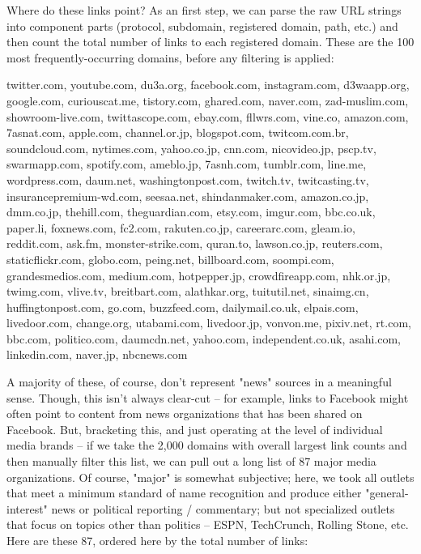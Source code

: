 \documentclass{scrartcl}
\begin{document}
Where do these links point? As an first step, we can parse the raw URL strings into component parts (protocol, subdomain, registered domain, path, etc.) and then count the total number of links to each registered domain. These are the 100 most frequently-occurring domains, before any filtering is applied:

\begin{displayquote}
\scriptsize \raggedright twitter.com, youtube.com, du3a.org, facebook.com, instagram.com, d3waapp.org, google.com, curiouscat.me, tistory.com, ghared.com, naver.com, zad-muslim.com, showroom-live.com, twittascope.com, ebay.com, fllwrs.com, vine.co, amazon.com, 7asnat.com, apple.com, channel.or.jp, blogspot.com, twitcom.com.br, soundcloud.com, nytimes.com, yahoo.co.jp, cnn.com, nicovideo.jp, pscp.tv, swarmapp.com, spotify.com, ameblo.jp, 7asnh.com, tumblr.com, line.me, wordpress.com, daum.net, washingtonpost.com, twitch.tv, twitcasting.tv, insurancepremium-wd.com, seesaa.net, shindanmaker.com, amazon.co.jp, dmm.co.jp, thehill.com, theguardian.com, etsy.com, imgur.com, bbc.co.uk, paper.li, foxnews.com, fc2.com, rakuten.co.jp, careerarc.com, gleam.io, reddit.com, ask.fm, monster-strike.com, quran.to, lawson.co.jp, reuters.com, staticflickr.com, globo.com, peing.net, billboard.com, soompi.com, grandesmedios.com, medium.com, hotpepper.jp, crowdfireapp.com, nhk.or.jp, twimg.com, vlive.tv, breitbart.com, alathkar.org, tuitutil.net, sinaimg.cn, huffingtonpost.com, go.com, buzzfeed.com, dailymail.co.uk, elpais.com, livedoor.com, change.org, utabami.com, livedoor.jp, vonvon.me, pixiv.net, rt.com, bbc.com, politico.com, daumcdn.net, yahoo.com, independent.co.uk, asahi.com, linkedin.com, naver.jp, nbcnews.com
\end{displayquote}

A majority of these, of course, don't represent "news" sources in a meaningful sense. Though, this isn't always clear-cut -- for example, links to Facebook might often point to content from news organizations that has been shared on Facebook. But, bracketing this, and just operating at the level of individual media brands -- if we take the 2,000 domains with overall largest link counts and then manually filter this list, we can pull out a long list of 87 major media organizations. Of course, "major" is somewhat subjective; here, we took all outlets that meet a minimum standard of name recognition and produce either "general-interest" news or political reporting / commentary; but not specialized outlets that focus on topics other than politics -- ESPN, TechCrunch, Rolling Stone, etc. Here are these 87, ordered here by the total number of links:
\end{document}
